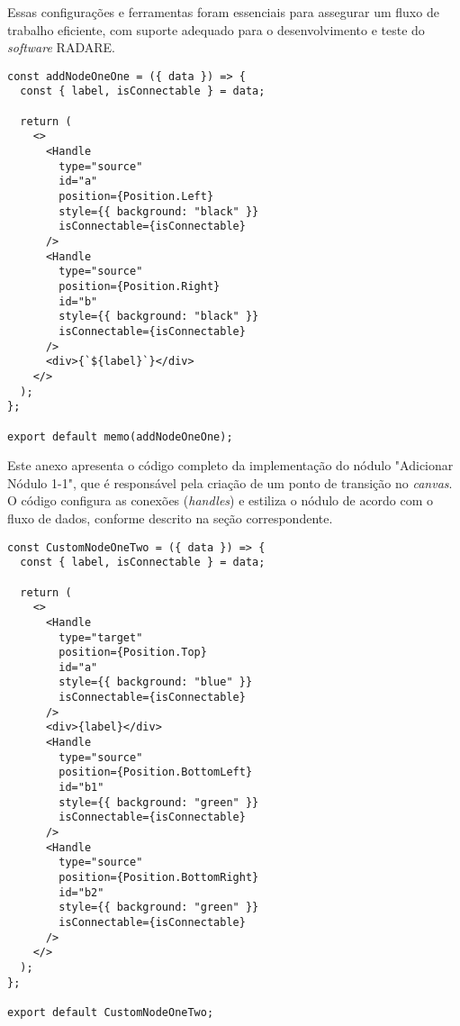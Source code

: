 Essas configurações e ferramentas foram essenciais para assegurar um fluxo de trabalho eficiente, com suporte adequado para o desenvolvimento e teste do \textit{software} RADARE.

\label{Anexo:frontCodeNodeOneOne}

\begin{verbatim}
const addNodeOneOne = ({ data }) => {
  const { label, isConnectable } = data;

  return (
    <>
      <Handle
        type="source"
        id="a"
        position={Position.Left}
        style={{ background: "black" }}
        isConnectable={isConnectable}
      />
      <Handle
        type="source"
        position={Position.Right}
        id="b"
        style={{ background: "black" }}
        isConnectable={isConnectable}
      />
      <div>{`${label}`}</div>
    </>
  );
};

export default memo(addNodeOneOne);
\end{verbatim}

Este anexo apresenta o código completo da implementação do nódulo "Adicionar Nódulo 1-1", que é responsável pela criação de um ponto de transição no \textit{canvas}. O código configura as conexões (\textit{handles}) e estiliza o nódulo de acordo com o fluxo de dados, conforme descrito na seção correspondente.

\label{Anexo:frontCodeNodeOneTwo}

\begin{verbatim}
const CustomNodeOneTwo = ({ data }) => {
  const { label, isConnectable } = data;

  return (
    <>
      <Handle
        type="target"
        position={Position.Top}
        id="a"
        style={{ background: "blue" }}
        isConnectable={isConnectable}
      />
      <div>{label}</div>
      <Handle
        type="source"
        position={Position.BottomLeft}
        id="b1"
        style={{ background: "green" }}
        isConnectable={isConnectable}
      />
      <Handle
        type="source"
        position={Position.BottomRight}
        id="b2"
        style={{ background: "green" }}
        isConnectable={isConnectable}
      />
    </>
  );
};

export default CustomNodeOneTwo;
\end{verbatim}

